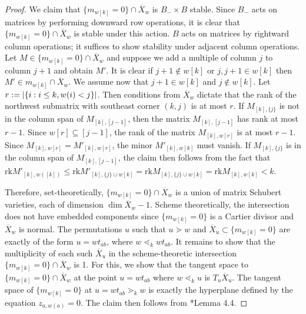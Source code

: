 \documentclass[12pt,reqno]{amsart}
\theoremstyle{definition}
\newcommand{\rk}{\textrm{rk}}
\DeclarePairedDelimiter\abs{\lvert}{\rvert}%
\begin{document}
{\begin{proof}
     We claim that $\{m_{w[k]}=0\}\cap \overline{X}_w$ is $B_-\times B$ stable. Since $B_-$ acts on matrices by performing downward row operations, it is clear that $\{m_{w[k]}=0\}\cap \overline{X}_w$ is stable under this action. $B$ acts on matrices by rightward column operations; it suffices to show stability under adjacent column operations. Let $M\in \{m_{w[k]}=0\}\cap \overline{X}_w$ and suppose we add a multiple of column $j$ to column $j+1$ and obtain $M'$. It is clear if $j+1\not\in w[k]$ or $j,j+1\in w[k]$ then $M'\in m_{w[k]}\cap \overline{X}_w$. We assume now that $j+1\in w[k]$ and $j\not\in w[k]$.  Let $r:=\abs{\{i:i\le k, w(i)<j\}}$. Then conditions from $\overline{X}_w$ dictate that the rank of the northwest submatrix with southeast corner $(k,j)$ is at most $r$. If $M_{[k],\{j\}}$ is not in the column span of $M_{[k],[j-1]}$, then the matrix $M_{[k],[j-1]}$ has rank at most $r-1$. Since $w[r]\subseteq [j-1]$, the rank of the matrix $M_{[k], w[r]}$ is at most $r-1$. Since $M_{[k], w[r]}=M'_{[k], w[r]}$, the minor $M'_{[k],w[k]}$ must vanish. If $M_{[k],\{j\}}$ is in the column span of $M_{[k],[j-1]}$, the claim then follows from the fact that $\rk M'_{[k],w([k])}\le\rk M'_{[k],\{j\}\cup w[k]}=\rk M_{[k],\{j\}\cup w[k]}=\rk M_{[k], w[k]}<k$. 

    Therefore, set-theoretically, $\{m_{w[k]}=0\}\cap \overline{X}_w$ is a union of matrix Schubert varieties, each of dimension $\dim \overline{X}_w-1$. Scheme theoretically, the intersection does not have embedded components since $\{m_{w[k]}=0\}$ is a Cartier divisor and $\overline{X}_w$ is normal. The permutations $u$ such that $u\gtrdot w$ and $\overline{X}_u\subset \{m_{w[k]}=0\}$ are exactly of the form $u=wt_{ab}$, where $w\lessdot_k wt_{ab}$.  It remains to show that the multiplicity of each such $\overline{X}_u$ in the scheme-theoretic intersection $\{m_{w[k]}=0\}\cap \overline{X}_w$ is 1. For this, we show that the tangent space to $\{m_{w[k]}=0\}\cap \overline{X}_w$ at the point $u=wt_{ab}$ where $w\lessdot_k u$ is $T_u\overline{X}_u$. The tangent space of $\{m_{w[k]}=0\}$ at $u=wt_{ab}\gtrdot_k w$ is exactly the hyperplane defined by the equation $z_{a,w(a)}=0$. 
    The claim then follows from \cite{knutson2022schubert}*{Lemma 4.4}. \qedhere

\end{proof}

}
\end{document}
